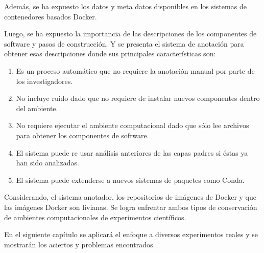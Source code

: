 Además, se ha expuesto los datos y meta datos disponibles en los sistemas de contenedores basados Docker. 

Luego, se ha expuesto la importancia de las descripciones de los componentes de software y pasos de construcción.
Y se presenta el sistema de anotación para obtener esas descripciones donde sus principales características son:
\begin{enumerate}
	\item Es un proceso automático que no requiere la anotación manual por parte de los investigadores.
	\item No incluye ruido dado que no requiere de instalar nuevos componentes dentro del ambiente.
	\item No requiere ejecutar el ambiente  computacional dado que  sólo lee archivos para obtener los componentes de software.
	\item El sistema puede re usar análisis anteriores de las capas padres si éstas ya han sido analizadas.
	\item El sistema puede extenderse a nuevos sistemas de paquetes como Conda.
\end{enumerate}

Considerando, el sistema anotador, los repositorios de imágenes de Docker y que las imágenes Docker son livianas. Se logra enfrentar ambos tipos de conservación de ambientes computacionales de experimentos científicos. 

En el siguiente capítulo se aplicará el enfoque a diversos experimentos reales y se mostrarán los aciertos y problemas encontrados.